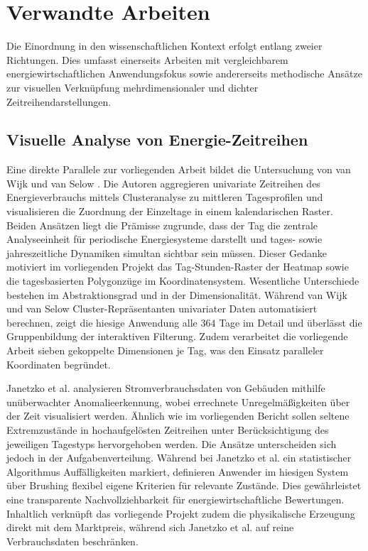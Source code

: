 \section{Verwandte Arbeiten}

Die Einordnung in den wissenschaftlichen Kontext erfolgt entlang zweier Richtungen. Dies umfasst einerseits Arbeiten mit vergleichbarem energiewirtschaftlichen Anwendungsfokus sowie andererseits methodische Ansätze zur visuellen Verknüpfung mehrdimensionaler und dichter Zeitreihendarstellungen.

\subsection*{Visuelle Analyse von Energie-Zeitreihen}

Eine direkte Parallele zur vorliegenden Arbeit bildet die Untersuchung von van Wijk und van Selow \cite{vanWijk1999}. Die Autoren aggregieren univariate Zeitreihen des Energieverbrauchs mittels Clusteranalyse zu mittleren Tagesprofilen und visualisieren die Zuordnung der Einzeltage in einem kalendarischen Raster. Beiden Ansätzen liegt die Prämisse zugrunde, dass der Tag die zentrale Analyseeinheit für periodische Energiesysteme darstellt und tages- sowie jahreszeitliche Dynamiken simultan sichtbar sein müssen. Dieser Gedanke motiviert im vorliegenden Projekt das Tag-Stunden-Raster der Heatmap sowie die tagesbasierten Polygonzüge im Koordinatensystem. Wesentliche Unterschiede bestehen im Abstraktionsgrad und in der Dimensionalität. Während van Wijk und van Selow Cluster-Repräsentanten univariater Daten automatisiert berechnen, zeigt die hiesige Anwendung alle 364 Tage im Detail und überlässt die Gruppenbildung der interaktiven Filterung. Zudem verarbeitet die vorliegende Arbeit sieben gekoppelte Dimensionen je Tag, was den Einsatz paralleler Koordinaten begründet.

Janetzko et al. \cite{Janetzko2014} analysieren Stromverbrauchsdaten von Gebäuden mithilfe unüberwachter Anomalieerkennung, wobei errechnete Unregelmäßigkeiten über der Zeit visualisiert werden. Ähnlich wie im vorliegenden Bericht sollen seltene Extremzustände in hochaufgelösten Zeitreihen unter Berücksichtigung des jeweiligen Tagestyps hervorgehoben werden. Die Ansätze unterscheiden sich jedoch in der Aufgabenverteilung. Während bei Janetzko et al. ein statistischer Algorithmus Auffälligkeiten markiert, definieren Anwender im hiesigen System über Brushing flexibel eigene Kriterien für relevante Zustände. Dies gewährleistet eine transparente Nachvollziehbarkeit für energiewirtschaftliche Bewertungen. Inhaltlich verknüpft das vorliegende Projekt zudem die physikalische Erzeugung direkt mit dem Marktpreis, während sich Janetzko et al. auf reine Verbrauchsdaten beschränken.

